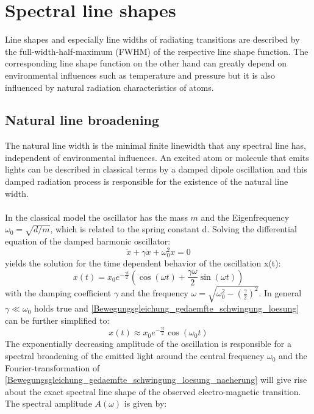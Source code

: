 \section{Spectral line shapes}
Line shapes and especially line widths of radiating transitions are described by the full-width-half-maximum (FWHM) of the respective line shape function. The corresponding line shape function on the other hand can greatly depend on environmental influences such as temperature and pressure but it is also influenced by natural radiation characteristics of atoms.
\subsection{Natural line broadening}
The natural line width is the minimal finite linewidth that any spectral line has, independent of environmental influences. An excited atom or molecule that emits lights can be described in classical terms by a damped dipole oscillation and this damped radiation process is responsible for the existence of the natural line width. \\ \\In the classical model the oscillator has the mass $m$ and the Eigenfrequency $\omega_0=\sqrt{d/m}$, which is related to the spring constant d. Solving the differential equation of the damped harmonic oscillator:
\begin{equation}
\ddot{x}+\gamma \dot{x}+ \omega_0^2x=0
\label{Bewegungsgleichung_gedaemfte_schwingung}
\end{equation}
yields the solution for the time dependent behavior of the oscillation x(t):
\begin{equation}
x(t)=x_0 e^{-\frac{\gamma t}{2}}(\cos(\omega t)+\frac{\gamma \omega}{2}\sin(\omega t))
\label{Bewegungsgleichung_gedaemfte_schwingung_loesung}
\end{equation}
with the damping coefficient $\gamma$ and the frequency $\omega=\sqrt{\omega_0^2-(\frac{\gamma}{2})^2}$. In general $\gamma\ll\omega_0$ holds true and  \ref{Bewegungsgleichung_gedaemfte_schwingung_loesung} can be further simplified to:
\begin{equation}
x(t)\approx x_0 e^{-\frac{\gamma t}{2}} \cos(\omega_0 t)
\label{Bewegungsgleichung_gedaemfte_schwingung_loesung_naeherung}
\end{equation}
The exponentially decreasing amplitude of the oscillation is responsible for a spectral broadening of the emitted light around the central frequency $\omega_0$ and the Fourier-transformation of \ref{Bewegungsgleichung_gedaemfte_schwingung_loesung_naeherung} will give rise about the exact spectral line shape of the observed electro-magnetic transition. The spectral amplitude $A(\omega)$ is given by:
